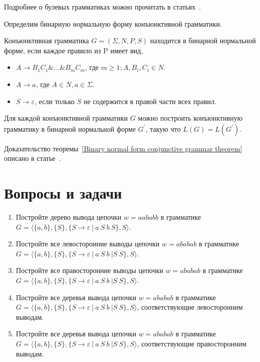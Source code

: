 Подробнее о булевых грамматиках можно прочитать в статьях~\cite{Okhotin:2003:BG:1758089.1758123,Okhotin:2014:PMM:2565359.2565379}.

Определим бинарную нормальную форму конъюнктивной грамматики.
\begin{definition}
    Конъюнктивная грамматика $G = (\Sigma, N, P, S)$ находится в бинарной нормальной форме, если каждое правило из P имеет вид,
    \begin{itemize}
        \item $A \rightarrow B_1 C_1 \& \ldots\& B_m C_m$, где $m \geqslant 1; A,B_i,C_i \in N$.
        \item $A \rightarrow a$, где $A \in N, a \in \Sigma$.
        \item $S \rightarrow \varepsilon$, если только $S$ не содержится в правой части всех правил.
    \end{itemize}
\end{definition}

\begin{theorem}\label{Binary normal form conjunctive grammar theorem}
    Для каждой конъюнктивной грамматики $G$ можно построить конъюнктивную грамматику в бинарной нормальной форме $G^{'}$, такую что $L(G) = L(G^{'})$.
\end{theorem}
Доказательство теоремы~\ref{Binary normal form conjunctive grammar theorem} описано в статье~\cite{DBLP:journals/jalc/Okhotin01}.



\section{Вопросы и задачи}
\begin{enumerate}
  \item Постройте дерево вывода цепочки $w=aababb$ в грамматике $G=\langle\{a,b\},\{S\},\{S\rightarrow \varepsilon \ | \ a \ S \ b \ S \}, S \rangle$.
  \item Постройте все левосторонние выводы цепочки $w=ababab$ в грамматике $G=\langle\{a,b\},\{S\},\{S\rightarrow \varepsilon \ | \ a \ S \ b \ | S \ S\}, S \rangle$.
  \item Постройте все правосторонние выводы цепочки $w=ababab$ в грамматике $G=\langle\{a,b\},\{S\},\{S\rightarrow \varepsilon \ | \ a \ S \ b \ | S \ S\}, S \rangle$.
  \item \label{t1}Постройте все деревья вывода цепочки $w=ababab$ в грамматике $G=\langle\{a,b\},\{S\},\{S\rightarrow \varepsilon \ | \ a \ S \ b \ | S \ S\}, S \rangle$, соответствующие левосторонним выводам.
  \item \label{t2}Постройте все деревья вывода цепочки $w=ababab$ в грамматике $G=\langle\{a,b\},\{S\},\{S\rightarrow \varepsilon \ | \ a \ S \ b \ | S \ S\}, S \rangle$, соответствующие правосторонним выводам.
\end{enumerate}
